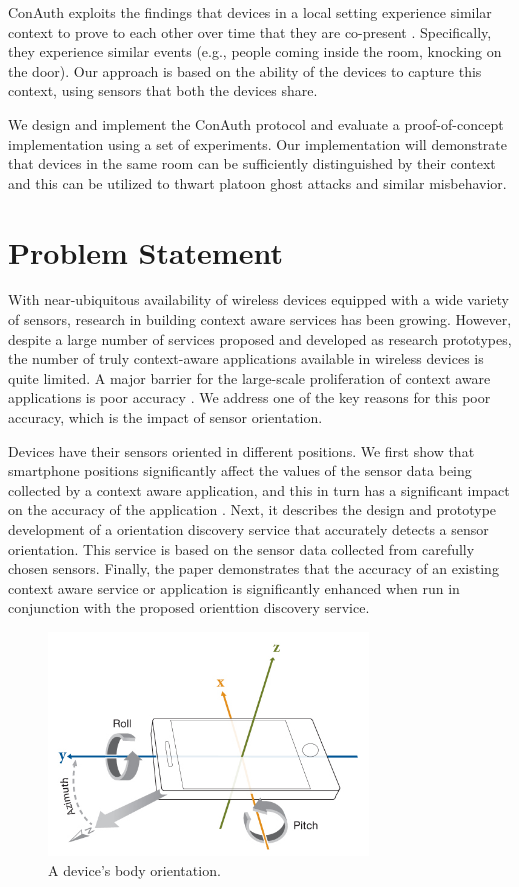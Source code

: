 \documentclass[journal]{IEEEtranTIE}
\begin{document}
ConAuth exploits the findings that devices in a local setting experience similar context
to prove to each other over time that they are co-present \cite{Han}.
Specifically, they experience similar events (e.g., people coming inside the
room, knocking on the door). Our approach is based on the ability of the devices
to capture this context, using sensors that both the devices share.

We design and implement the ConAuth protocol and evaluate a proof-of-concept
implementation using a set of experiments. Our implementation will demonstrate
that devices in the same room can be sufficiently distinguished by their context
and this can be utilized to thwart platoon ghost attacks and similar misbehavior.

\section{Problem Statement}

With near-ubiquitous availability of wireless devices equipped with a wide
variety of sensors, research in building context aware services has been
growing. However, despite a large number of services proposed and developed as
research prototypes, the number of truly context-aware applications available in
wireless devices is quite limited. A major barrier for the large-scale
proliferation of context aware applications is poor accuracy \cite{Alanezi}.
We address one of the key reasons for this poor accuracy, which is the impact of
sensor orientation.

Devices have their sensors oriented in different positions. We first show that
smartphone positions significantly affect the values of the
sensor data being collected by a context aware application, and this in turn
has a significant impact on the accuracy of the application \cite{Alanezi}.
Next, it describes the design and prototype development of a orientation
discovery service that accurately detects a sensor orientation. This service is
based on the sensor data collected from carefully chosen sensors. Finally, the
paper demonstrates that the accuracy of an existing context aware service or
application is significantly enhanced when run in conjunction with the proposed
orienttion discovery service.


\begin{figure}[!t]\centering
	\includegraphics[width=8.5cm]{phoneOrientation}
	\caption{A device's body orientation.}\label{fig1}
\end{figure}
\end{document}
